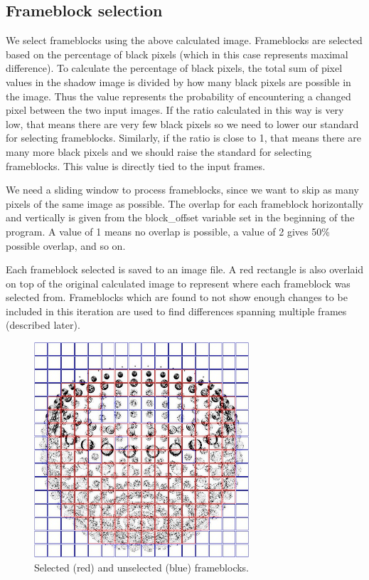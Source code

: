 \documentclass[conference]{IEEEtran}
\begin{document}
\subsection{Frameblock selection}
\label{subsec:frameblock_selection}
We select frameblocks using the above calculated image.
Frameblocks are selected based on the percentage of black pixels
(which in this case represents maximal difference).
To calculate the percentage of black pixels,
the total sum of pixel values in the shadow image is divided by how many black pixels are possible in the image.
Thus the value represents the probability of encountering a changed pixel between the two input images.
If the ratio calculated in this way is very low,
that means there are very few black pixels so we need to lower our standard for selecting frameblocks.
Similarly, if the ratio is close to 1,
that means there are many more black pixels and we should raise the standard for selecting frameblocks.
This value is directly tied to the input frames.

We need a sliding window to process frameblocks,
since we want to skip as many pixels of the same image as possible.
The overlap for each frameblock horizontally and vertically is given from the
block\_offset variable set in the beginning of the program.
A value of 1 means no overlap is possible,
a value of 2 gives 50\% possible overlap, and so on.

Each frameblock selected is saved to an image file.
A red rectangle is also overlaid on top of the original calculated image to represent where each frameblock was selected from.
Frameblocks which are found to not show enough changes to be included in this iteration are used to find differences spanning multiple frames (described later).

\begin{figure}[htbp]
\centerline{\includegraphics[width=8cm]{shadow_roi.png}}
\caption{Selected (red) and unselected (blue) frameblocks.}
\label{fig:shadow_roi}
\end{figure}
\end{document}

